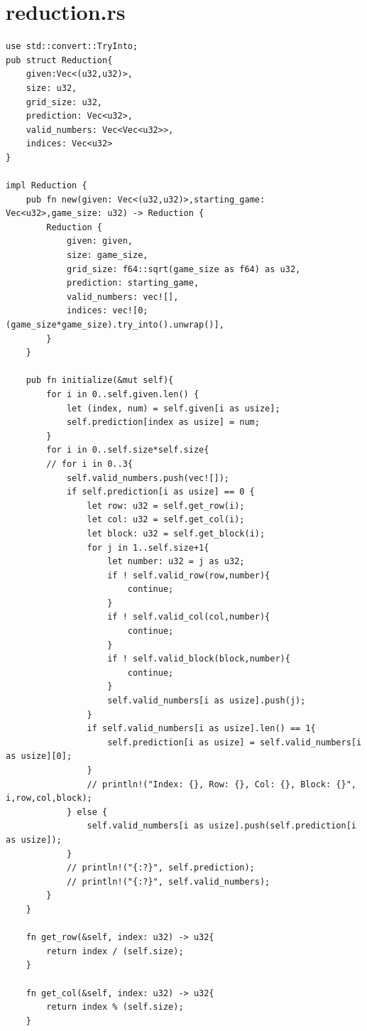 \documentclass[12pt]{article}
\begin{document}
\section{reduction.rs}
\begin{verbatim}
use std::convert::TryInto;
pub struct Reduction{
    given:Vec<(u32,u32)>,
    size: u32,
    grid_size: u32,
    prediction: Vec<u32>,
    valid_numbers: Vec<Vec<u32>>,
    indices: Vec<u32>  
}

impl Reduction {
    pub fn new(given: Vec<(u32,u32)>,starting_game: Vec<u32>,game_size: u32) -> Reduction {
        Reduction {
            given: given,
            size: game_size,
            grid_size: f64::sqrt(game_size as f64) as u32,
            prediction: starting_game,
            valid_numbers: vec![],
            indices: vec![0;(game_size*game_size).try_into().unwrap()],
        }
    }

    pub fn initialize(&mut self){
        for i in 0..self.given.len() {
            let (index, num) = self.given[i as usize];
            self.prediction[index as usize] = num;
        }
        for i in 0..self.size*self.size{
        // for i in 0..3{
            self.valid_numbers.push(vec![]);
            if self.prediction[i as usize] == 0 {
                let row: u32 = self.get_row(i);
                let col: u32 = self.get_col(i);
                let block: u32 = self.get_block(i);
                for j in 1..self.size+1{
                    let number: u32 = j as u32;
                    if ! self.valid_row(row,number){
                        continue;
                    }
                    if ! self.valid_col(col,number){
                        continue;
                    }
                    if ! self.valid_block(block,number){
                        continue;
                    }
                    self.valid_numbers[i as usize].push(j);
                }    
                if self.valid_numbers[i as usize].len() == 1{
                    self.prediction[i as usize] = self.valid_numbers[i as usize][0];
                }            
                // println!("Index: {}, Row: {}, Col: {}, Block: {}", i,row,col,block);
            } else {
                self.valid_numbers[i as usize].push(self.prediction[i as usize]);
            }
            // println!("{:?}", self.prediction);
            // println!("{:?}", self.valid_numbers);
        }
    }

    fn get_row(&self, index: u32) -> u32{
        return index / (self.size);
    }

    fn get_col(&self, index: u32) -> u32{
        return index % (self.size);
    }


\end{verbatim}
\end{document}
